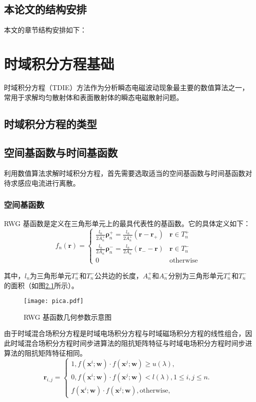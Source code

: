 \documentclass[bachelor]{thesis-uestc}
\begin{document}
\section{本论文的结构安排}
本文的章节结构安排如下：

\chapter{时域积分方程基础}
时域积分方程（TDIE）方法作为分析瞬态电磁波动现象最主要的数值算法之一，常用于求解均匀散射体和表面散射体的瞬态电磁散射问题。

\section{时域积分方程的类型}

\section{空间基函数与时间基函数}
利用数值算法求解时域积分方程，首先需要选取适当的空间基函数与时间基函数对待求感应电流进行离散。

\subsection{空间基函数}
RWG 基函数是定义在三角形单元上的最具代表性的基函数。它的具体定义如下：
\begin{equation}
f_n(\bm{r})=
\begin{cases}
\frac{l_n}{2A_n^+}\bm{\rho}_n^+=\frac{l_n}{2A_n^+}(\bm{r}-\bm{r}_+)&\bm{r}\in T_n^+\\
\frac{l_n}{2A_n^-}\bm{\rho}_n^-=\frac{l_n}{2A_n^-}(\bm{r}_--\bm{r})&\bm{r}\in T_n^-\\
0&\text{otherwise}
\end{cases}
\end{equation}

其中，$l_n$为三角形单元$T_n^+$和$T_n^-$公共边的长度，$A_n^+$和$A_n^-$分别为三角形单元$T_n^+$和$T_n^-$的面积（如图\ref{pica}所示）。

\begin{figure}[h]
\texttt{[image: pica.pdf]}
\caption{RWG 基函数几何参数示意图}
\label{pica}
\end{figure}

由于时域混合场积分方程是时域电场积分方程与时域磁场积分方程的线性组合，因此时域混合场积分方程时间步进算法的阻抗矩阵特征与时域电场积分方程时间步进算法的阻抗矩阵特征相同。
\begin{equation}
\label{latent_binary_variable}
\bm{r}_{i,j}=
\begin{cases}
1,f(\bm{x}^{i};\bm{w})\cdot f(\bm{x}^{j};\bm{w})\geq u(\lambda),\\
0,f(\bm{x}^{i};\bm{w})\cdot f(\bm{x}^{j};\bm{w})< l(\lambda), 1\leq i,j\leq n.\\
f(\bm{x}^{i};\bm{w})\cdot f(\bm{x}^{j};\bm{w}),\text{otherwise},
\end{cases}
\end{equation}
\end{document}
